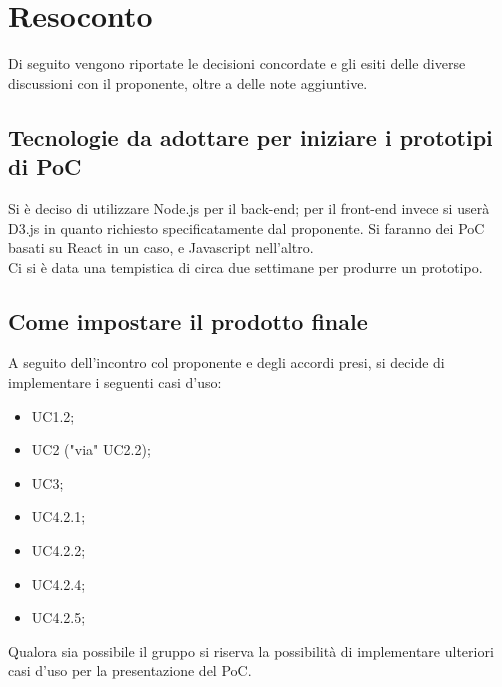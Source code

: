 \documentclass{article}
\begin{document}
\section{Resoconto}
\label{sec:resoconto}

Di seguito vengono riportate le decisioni concordate e gli esiti delle diverse discussioni con il proponente, oltre a
delle note aggiuntive.

\subsection{Tecnologie da adottare per iniziare i prototipi di PoC}
\label{itm:1}

Si è deciso di utilizzare Node.js per il back-end; per il front-end invece si userà D3.js in quanto richiesto specificatamente dal proponente. Si faranno dei PoC basati su React in un caso, e Javascript nell’altro. \\
Ci si è data una tempistica di circa due settimane per produrre un prototipo.


\subsection{Come impostare il prodotto finale}
\label{itm:2}

A seguito dell’incontro col proponente e degli accordi presi, si decide di implementare i seguenti casi d’uso:

\begin{itemize}
	\item UC1.2;
	\item UC2 ("via" UC2.2);
	\item UC3;
	\item UC4.2.1;
	\item UC4.2.2;
	\item UC4.2.4;
	\item UC4.2.5;
\end{itemize}
Qualora sia possibile il gruppo si riserva la possibilità di implementare ulteriori casi d’uso per la presentazione del PoC.
\end{document}
